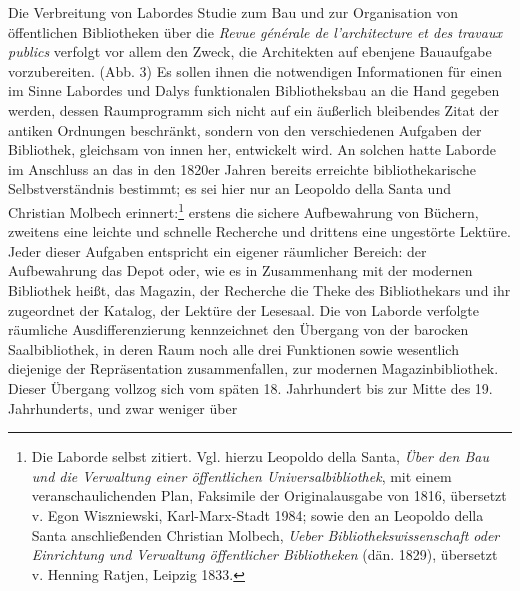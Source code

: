 Die Verbreitung von Labordes Studie zum Bau und zur Organisation von
öffentlichen Bibliotheken über die \emph{Revue générale de
l'architecture et des travaux publics} verfolgt vor allem den Zweck, die
Architekten auf ebenjene Bauaufgabe vorzubereiten. (Abb. 3) Es sollen
ihnen die notwendigen Informationen für einen im Sinne Labordes und
Dalys funktionalen Bibliotheksbau an die Hand gegeben werden, dessen
Raumprogramm sich nicht auf ein äußerlich bleibendes Zitat der antiken
Ordnungen beschränkt, sondern von den verschiedenen Aufgaben der
Bibliothek, gleichsam von innen her, entwickelt wird. An solchen hatte
Laborde im Anschluss an das in den 1820er Jahren bereits erreichte
bibliothekarische Selbstverständnis bestimmt; es sei hier nur an
Leopoldo della Santa und Christian Molbech erinnert:\footnote{Die
  Laborde selbst zitiert. Vgl. hierzu Leopoldo della Santa, \emph{Über
  den Bau und die Verwaltung einer öffentlichen Universalbibliothek},
  mit einem veranschaulichenden Plan, Faksimile der Originalausgabe von
  1816, übersetzt v. Egon Wiszniewski, Karl-Marx-Stadt 1984; sowie den
  an Leopoldo della Santa anschließenden Christian Molbech, \emph{Ueber
  Bibliothekswissenschaft oder Einrichtung und Verwaltung öffentlicher
  Bibliotheken} (dän. 1829), übersetzt v. Henning Ratjen, Leipzig 1833.}
erstens die sichere Aufbewahrung von Büchern, zweitens eine leichte und
schnelle Recherche und drittens eine ungestörte Lektüre. Jeder dieser
Aufgaben entspricht ein eigener räumlicher Bereich: der Aufbewahrung das
Depot oder, wie es in Zusammenhang mit der modernen Bibliothek heißt,
das Magazin, der Recherche die Theke des Bibliothekars und ihr
zugeordnet der Katalog, der Lektüre der Lesesaal. Die von Laborde
verfolgte räumliche Ausdifferenzierung kennzeichnet den Übergang von der
barocken Saalbibliothek, in deren Raum noch alle drei Funktionen sowie
wesentlich diejenige der Repräsentation zusammenfallen, zur modernen
Magazinbibliothek. Dieser Übergang vollzog sich vom späten 18.
Jahrhundert bis zur Mitte des 19. Jahrhunderts, und zwar weniger über
